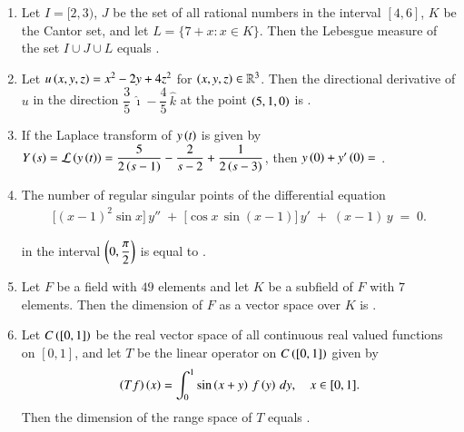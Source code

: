 \documentclass[journal,12pt,onecolumn]{IEEEtran}
\theoremstyle{remark}
\begin{document}
\begin{enumerate}[start=10]
\item Let $I = [2, 3)$, $J$ be the set of all rational numbers in the interval $[4, 6]$, $K$ be the Cantor
 set, and let $L = \{7 + x \colon x \in K\}$. Then the Lebesgue measure of the set $I \cup J \cup L$
equals \underline{\hspace{2cm}}. 

\hfill{}

\item Let $u\left(x, y, z\right) = x^2 - 2y + 4z^2$ for $\left(x, y, z\right) \in \mathbb{R}^3$. Then the directional derivative of $u$ in the
direction $\dfrac{3}{5}\,\hat{\imath}- \dfrac{4}{5}\,\hat{k}$ at the point $\left(5, 1, 0\right)$ is \underline{\hspace{2cm}}.

\hfill{}

\item If the Laplace transform of $y\left(t\right)$ is given by $Y\left(s\right) = \mathcal{L}\left(y\left(t\right)\right) =
\dfrac{5}{2\left(s- 1\right)} - \dfrac{2}{s- 2} + \dfrac{1}{2\left(s- 3\right)}$,
then $y\left(0\right) + y'\left(0\right) = $ \underline{\hspace{2cm}}.

\hfill{}

\item The number of regular singular points of the differential equation
\begin{align*}
\bigl[(x-1)^2 \sin x\bigr]\,y'' \;+\; \bigl[\cos x\,\sin(x-1)\bigr]\,y' \;+\; (x-1)\,y \;=\; 0.
\end{align*}

in the interval $\left(0, \dfrac{\pi}{2}\right)$ is equal to \underline{\hspace{2cm}}.

\hfill{}

\item Let $F$ be a field with $49$ elements and let $K$ be a subfield of $F$ with $7$ elements. Then the
dimension of $F$ as a vector space over $K$ is \underline{\hspace{2cm}}. 

\hfill{}

\item Let $C\left([0, 1]\right)$ be the real vector space of all continuous real valued functions on $[0, 1]$, and let
$T$ be the linear operator on $C\left([0, 1]\right)$ given by
\begin{align*}
\left(Tf\right)\left(x\right) = \int_{0}^{1} \sin\left(x+ y\right)\, f\left(y\right)\, dy,\quad x \in [0, 1].
\end{align*}
Then the dimension of the range space of $T$ equals \underline{\hspace{2cm}}. 


\end{enumerate}
\end{document}
